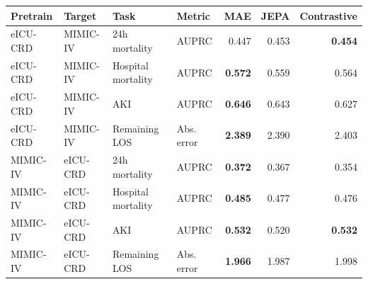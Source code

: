 \begin{tabular}{llllrrr}
\toprule
Pretrain & Target & Task & Metric & MAE & JEPA & Contrastive \\
\midrule
eICU-CRD & MIMIC-IV & 24h mortality & AUPRC & 0.447 & 0.453 & \textbf{0.454} \\
eICU-CRD & MIMIC-IV & Hospital mortality & AUPRC & \textbf{0.572} & 0.559 & 0.564 \\
eICU-CRD & MIMIC-IV & AKI & AUPRC & \textbf{0.646} & 0.643 & 0.627 \\
eICU-CRD & MIMIC-IV & Remaining LOS & Abs. error & \textbf{2.389} & 2.390 & 2.403 \\
MIMIC-IV & eICU-CRD & 24h mortality & AUPRC & \textbf{0.372} & 0.367 & 0.354 \\
MIMIC-IV & eICU-CRD & Hospital mortality & AUPRC & \textbf{0.485} & 0.477 & 0.476 \\
MIMIC-IV & eICU-CRD & AKI & AUPRC & \textbf{0.532} & 0.520 & \textbf{0.532} \\
MIMIC-IV & eICU-CRD & Remaining LOS & Abs. error & \textbf{1.966} & 1.987 & 1.998 \\
\bottomrule
\end{tabular}
